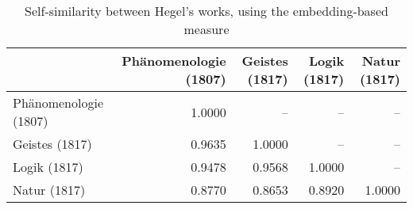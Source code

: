 \begin{table}[ht!]
\centering
\caption{Self-similarity between Hegel's works, using the embedding-based measure}
\label{tab:hegelself}
\begin{tabular}{lrrrr}
\toprule
{} &  Phänomenologie (1807) &  Geistes (1817) &  Logik (1817) &  Natur (1817) \\
\midrule
Phänomenologie (1807) &                 1.0000 &              -- &            -- &            -- \\
Geistes (1817)        &                 0.9635 &          1.0000 &            -- &            -- \\
Logik (1817)          &                 0.9478 &          0.9568 &        1.0000 &            -- \\
Natur (1817)          &                 0.8770 &          0.8653 &        0.8920 &        1.0000 \\
\bottomrule
\end{tabular}
\end{table}
